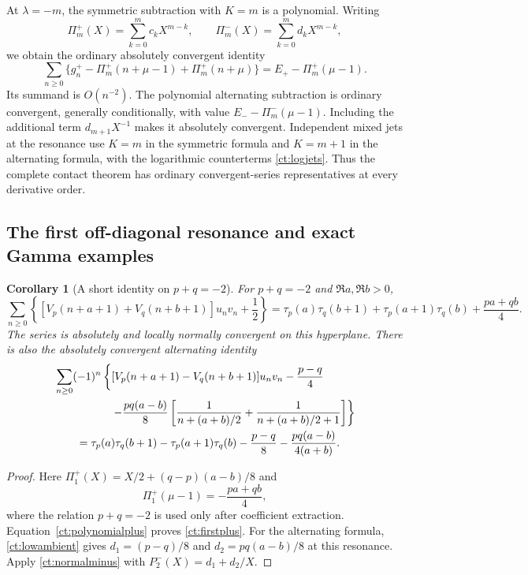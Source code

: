 \documentclass[11pt,letterpaper]{article}
\numberwithin{equation}{section}
\newtheorem{corollary}[theorem]{Corollary}
\theoremstyle{definition}
\theoremstyle{remark}
\begin{document}
At $\lambda=-m$, the symmetric subtraction with $K=m$ is a polynomial.
Writing
\begin{equation}\label{ct:resonantP}
 \Pi_m^+(X)=\sum_{k=0}^mc_kX^{m-k},\qquad
 \Pi_m^-(X)=\sum_{k=0}^md_kX^{m-k},
\end{equation}
we obtain the ordinary absolutely convergent identity
\begin{equation}\label{ct:polynomialplus}
 \sum_{n\ge0}\{g_n^+-\Pi_m^+(n+\mu-1)+\Pi_m^+(n+\mu)\}
              =E_+-\Pi_m^+(\mu-1).
\end{equation}
Its summand is $O(n^{-2})$. The polynomial alternating subtraction is
ordinary convergent, generally conditionally, with value
$E_--\Pi_m^-(\mu-1)$. Including the additional term
$d_{m+1}X^{-1}$ makes it absolutely convergent. Independent mixed jets
at the resonance use $K=m$ in the symmetric formula and $K=m+1$ in
the alternating formula, with the logarithmic counterterms
\eqref{ct:logjets}. Thus the complete contact theorem has ordinary
convergent-series representatives at every derivative order.

\subsection{The first off-diagonal resonance and exact Gamma examples}

\begin{corollary}[A short identity on $p+q=-2$]\label{ct:firstresonance}
For $p+q=-2$ and $\Re a,\Re b>0$,
\begin{equation}\label{ct:firstplus}
 \boxed{\displaystyle
 \sum_{n\ge0}\left\{
  [V_p(n+a+1)+V_q(n+b+1)]u_nv_n+\frac12\right\}
 =\tau_p(a)\tau_q(b+1)+\tau_p(a+1)\tau_q(b)+\frac{pa+qb}{4}.}
\end{equation}
The series is absolutely and locally normally convergent on this
hyperplane. There is also the absolutely convergent alternating identity
\begin{align}
 &\sum_{n\ge0}(-1)^n\left\{
 [V_p(n+a+1)-V_q(n+b+1)]u_nv_n-\frac{p-q}{4}\right.\notag\\
 &\hspace{18mm}\left.
 -\frac{pq(a-b)}8\left[\frac1{n+(a+b)/2}
                      +\frac1{n+(a+b)/2+1}\right]\right\}\notag\\
 &\qquad=\tau_p(a)\tau_q(b+1)-\tau_p(a+1)\tau_q(b)
            -\frac{p-q}{8}-\frac{pq(a-b)}{4(a+b)}.
                                                    \label{ct:firstminus}
\end{align}
\end{corollary}
\begin{proof}
Here $\Pi_1^+(X)=X/2+(q-p)(a-b)/8$ and
\[
 \Pi_1^+(\mu-1)=-\frac{pa+qb}{4},
\]
where the relation $p+q=-2$ is used only after coefficient extraction.
Equation~\eqref{ct:polynomialplus} proves \eqref{ct:firstplus}.
For the alternating formula, \eqref{ct:lowambient} gives
$d_1=(p-q)/8$ and $d_2=pq(a-b)/8$ at this resonance. Apply
\eqref{ct:normalminus} with $P_2^-(X)=d_1+d_2/X$.
\end{proof}
\end{document}
